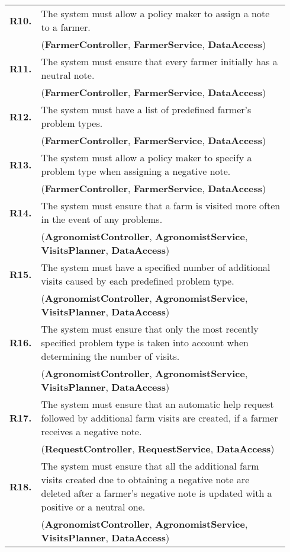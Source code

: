 \begin{longtable}{p{0.06\linewidth} p{0.88\linewidth}}
	\textbf{R10.} & The system must allow a policy maker to assign a note to a farmer.\\
	& (\textbf{FarmerController}, \textbf{FarmerService}, \textbf{DataAccess})\\
	\textbf{R11.} & The system must ensure that every farmer initially has a neutral note.\\
	& (\textbf{FarmerController}, \textbf{FarmerService}, \textbf{DataAccess})\\
	\textbf{R12.} & The system must have a list of predefined farmer's problem types.\\
	& (\textbf{FarmerController}, \textbf{FarmerService}, \textbf{DataAccess})\\
    \textbf{R13.} & The system must allow a policy maker to specify a problem type when assigning a negative note.\\
    & (\textbf{FarmerController}, \textbf{FarmerService}, \textbf{DataAccess})\\
    \textbf{R14.} & The system must ensure that a farm is visited more often in the event of any problems.\\
    & (\textbf{AgronomistController}, \textbf{AgronomistService}, \textbf{VisitsPlanner}, \textbf{DataAccess})\\
    \textbf{R15.} & The system must have a specified number of additional visits caused by each predefined problem type.\\
    & (\textbf{AgronomistController}, \textbf{AgronomistService}, \textbf{VisitsPlanner}, \textbf{DataAccess})\\
    \textbf{R16.} & The system must ensure that only the most recently specified problem type is taken into account when determining the number of visits.\\
    & (\textbf{AgronomistController}, \textbf{AgronomistService}, \textbf{VisitsPlanner}, \textbf{DataAccess})\\
	\textbf{R17.} & The system must ensure that an automatic help request followed by additional farm visits are created, if a farmer receives a negative note.\\
	& (\textbf{RequestController}, \textbf{RequestService}, \textbf{DataAccess})\\
	\textbf{R18.} & The system must ensure that all the additional farm visits created due to obtaining a negative note are deleted after a farmer's negative note is updated with a positive or a neutral one.\\
	& (\textbf{AgronomistController}, \textbf{AgronomistService}, \textbf{VisitsPlanner}, \textbf{DataAccess})\\
	

\end{longtable}

